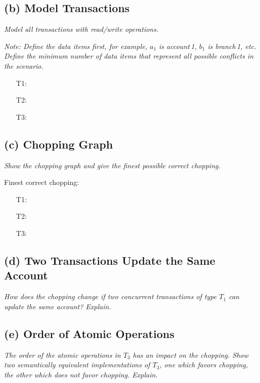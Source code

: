 \documentclass[11pt]{scrartcl}
\begin{document}
\subsection*{(b) Model Transactions}

{\it Model all transactions with read/write operations.}

\smallskip

{\it Note: Define the data items first, for example, $a_1$ is
   account\,1, $b_1$ is branch\,1, etc. Define the minimum number of
  data items that represent all possible conflicts in the scenario.}

\begin{enumerate}
\item[T1:]
\item[T2:]
\item[T3:] 
\end{enumerate}

\subsection*{(c) Chopping Graph}

{\it Show the chopping graph and give the finest possible correct
  chopping.}

\medskip


\medskip

\noindent Finest correct chopping:
\begin{enumerate}
\item[T1:]
\item[T2:]
\item[T3:] 
\end{enumerate}

\subsection*{(d) Two Transactions Update the Same Account}

{\it How does the chopping change if two concurrent transactions of type
$T_1$ can update the same account? Explain.}

\subsection*{(e) Order of Atomic Operations}

{\it The order of the atomic operations in $T_3$ has an impact on the
  chopping. Show two semantically equivalent implementations of $T_3$,
  one which favors chopping, the other which does not favor
  chopping. Explain.}
\end{document}
